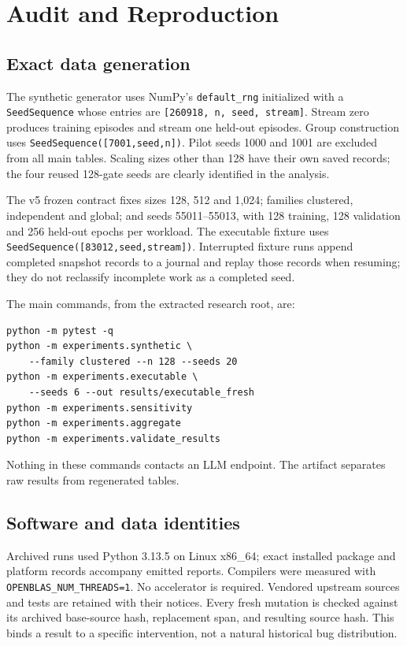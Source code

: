 \appendices

\section{Audit and Reproduction}\label{app:repro}
\subsection{Exact data generation}
The synthetic generator uses NumPy's \texttt{default\_rng} initialized with a
\texttt{SeedSequence} whose entries are \texttt{[260918, n, seed, stream]}.
Stream zero produces training episodes and stream one held-out episodes. Group
construction uses \texttt{SeedSequence([7001,seed,n])}. Pilot seeds 1000 and 1001
are excluded from all main tables. Scaling sizes other than 128 have their own
saved records; the four reused 128-gate seeds are clearly identified in the
analysis.

The v5 frozen contract fixes sizes 128, 512 and 1{,}024; families clustered,
independent and global; and seeds 55011--55013, with 128 training, 128 validation
and 256 held-out epochs per workload. The executable fixture uses
\texttt{SeedSequence([83012,seed,stream])}. Interrupted fixture runs append
completed snapshot records to a journal and replay those records when resuming;
they do not reclassify incomplete work as a completed seed.

The main commands, from the extracted research root, are:
\begin{verbatim}
python -m pytest -q
python -m experiments.synthetic \
    --family clustered --n 128 --seeds 20
python -m experiments.executable \
    --seeds 6 --out results/executable_fresh
python -m experiments.sensitivity
python -m experiments.aggregate
python -m experiments.validate_results
\end{verbatim}
Nothing in these commands contacts an LLM endpoint. The artifact separates raw
results from regenerated tables.

\subsection{Software and data identities}
Archived runs used Python 3.13.5 on Linux x86\_64; exact installed package and
platform records accompany emitted reports. Compilers were measured with
\texttt{OPENBLAS\_NUM\_THREADS=1}. No accelerator is required. Vendored upstream
sources and tests are retained with their notices. Every fresh mutation is checked
against its archived base-source hash, replacement span, and resulting source
hash. This binds a result to a specific intervention, not a natural historical bug
distribution.

